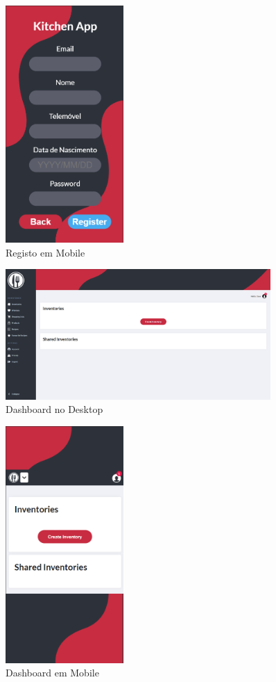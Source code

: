 \documentclass[a4paper]{report}
\begin{document}
    \begin{figure}[H]
    \centering
            \includegraphics[width=0.4\textwidth]{images/mockup/register_mobile.png}
            \caption{Registo em Mobile}
    \end{figure}
    \begin{figure}[H]
    \centering
            \includegraphics[width=0.9\textwidth]{images/mockup/dashboard_desktop.png}
            \caption{Dashboard no Desktop}
    \end{figure}
    \begin{figure}[H]
    \centering
            \includegraphics[width=0.4\textwidth]{images/mockup/dashboard_mobile.png}
            \caption{Dashboard em Mobile}
    \end{figure}
    
\end{document}
